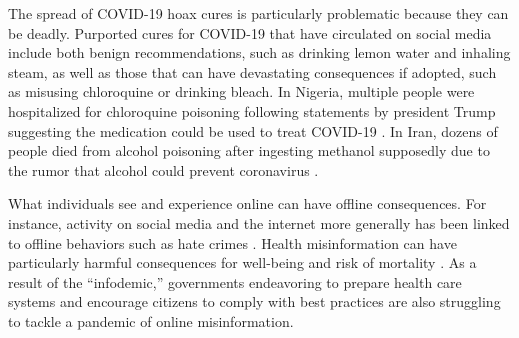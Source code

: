 \documentclass[letterpaper, 12pt, parskip=full,]{scrartcl}
\begin{document}
The spread of COVID-19 hoax cures is particularly problematic because they can be deadly. Purported cures for COVID-19 that have circulated on social media include both benign recommendations, such as drinking lemon water and inhaling steam, as well as those that can have devastating consequences if adopted, such as misusing chloroquine or drinking bleach. In Nigeria, multiple people were hospitalized for chloroquine poisoning following statements by president Trump suggesting the medication could be used to treat COVID-19 \citep{busari2020nigeria}. In Iran, dozens of people died from alcohol poisoning after ingesting methanol supposedly due to the rumor that alcohol could prevent coronavirus \citep{haghdoost2020alcohol}. 

What individuals see and experience online can have offline consequences. For instance, activity on social media and the internet more generally has been linked to offline behaviors such as hate crimes \citep{muller2019fanning, chan2016internet}. Health misinformation can have particularly harmful consequences for well-being and risk of mortality \citep{swire2020public}. As a result of the ``infodemic,'' governments endeavoring to prepare health care systems and encourage citizens to comply with best practices are also struggling to tackle a pandemic of online misinformation.
\end{document}
